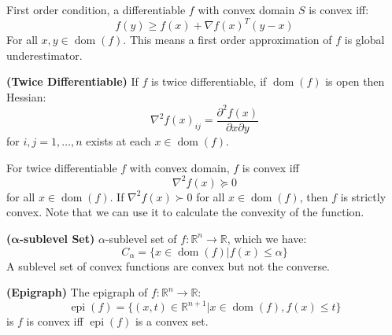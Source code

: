 \begin{lemma}
    First order condition, a differentiable $f$ with convex domain $S$ is convex iff:
    \begin{equation*}
        f(y) \ge f(x) + \nabla f(x)^T(y-x) 
    \end{equation*}
    For all $x, y \in \operatorname{dom}(f)$. This means a first order approximation of $f$ is global underestimator.
\end{lemma}

\begin{definition}{\textbf{(Twice Differentiable)}}
    If $f$ is twice differentiable, if $\operatorname{dom}(f)$ is open then Hessian:
    \begin{equation*}
        \nabla^2f(x)_{ij} = \frac{\partial^2 f(x)}{\partial x\partial y}
    \end{equation*}
    for $i, j = 1,\dots,n$ exists at each $x\in\operatorname{dom}(f)$.  
\end{definition}

\begin{lemma}
    For twice differentiable $f$ with convex domain, $f$ is convex iff 
    \begin{equation*}
        \nabla^2f(x)\succeq0
    \end{equation*}
    for all $x\in\operatorname{dom}(f)$. If $\nabla^2f(x)\succ0$ for all $x \in \operatorname{dom}(f)$, then $f$ is strictly convex. Note that we can use it to calculate the convexity of the function. 
\end{lemma}

\begin{definition}{\textbf{($\boldsymbol{\alpha}$-sublevel Set)}}
    $\alpha$-sublevel set of $f:\mathbb{R}^n\rightarrow \mathbb{R}$, which we have:
    \begin{equation*}
        C_\alpha = \Big\{ x\in\operatorname{dom}(f) \Big| f(x)\le\alpha \Big\}
    \end{equation*}
    A sublevel set of convex functions are convex but not the converse. 
\end{definition}

\begin{definition}{\textbf{(Epigraph)}}
    The epigraph of $f:\mathbb{R}^n\rightarrow \mathbb{R}$:
    \begin{equation*}
        \operatorname{epi}(f) = \Big\{ (x, t)\in \mathbb{R}^{n+1} \Big| x\in\operatorname{dom}(f), f(x)\le t \Big\}
    \end{equation*}
    is $f$ is convex iff $\operatorname{epi}(f)$ is a convex set. 
\end{definition}

